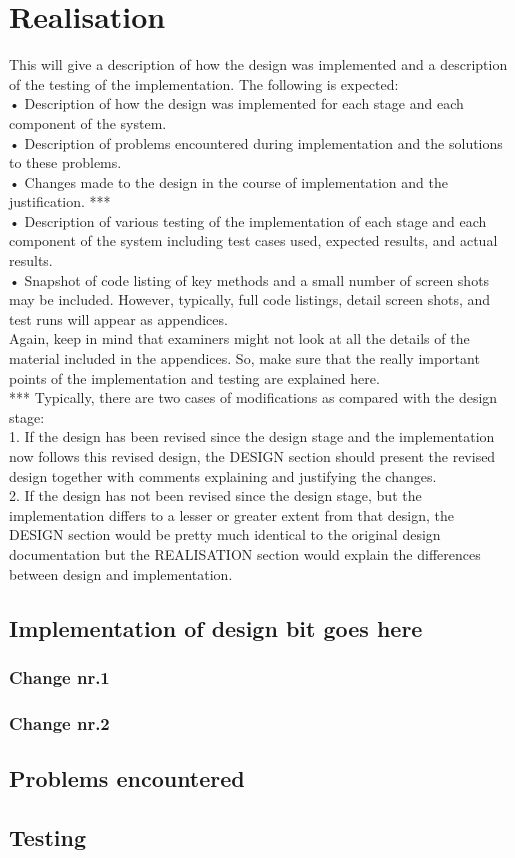 \chapter{Realisation}
\label{ch:realisation}

This will give a description of how the design was implemented and a description of the testing of the implementation. The following is expected: \\
• Description of how the design was implemented for each stage and each
component of the system. \\
• Description of problems encountered during implementation and the solutions to these problems.\\
• Changes made to the design in the course of implementation and the
justification. *** \\
• Description of various testing of the implementation of each stage and each component of the system including test cases used, expected results, and actual results. \\
• Snapshot of code listing of key methods and a small number of screen shots may be included. However, typically, full code listings, detail screen shots, and test runs will appear as appendices.\\
Again, keep in mind that examiners might not look at all the details of the material included in the appendices. So, make sure that the really important points of the implementation and testing are explained here.\\
*** Typically, there are two cases of modifications as compared with the design stage:\\
1. If the design has been revised since the design stage and the implementation now follows this revised design, the DESIGN section should present the revised design together with comments explaining and justifying the changes.\\
2. If the design has not been revised since the design stage, but the
implementation differs to a lesser or greater extent from that design, the
DESIGN section would be pretty much identical to the original design 
documentation but the REALISATION section would explain the differences
between design and implementation. \\

\section{Implementation of design bit goes here}
\subsection{Change nr.1}
\subsection{Change nr.2}

\section{Problems encountered}
\section{Testing}